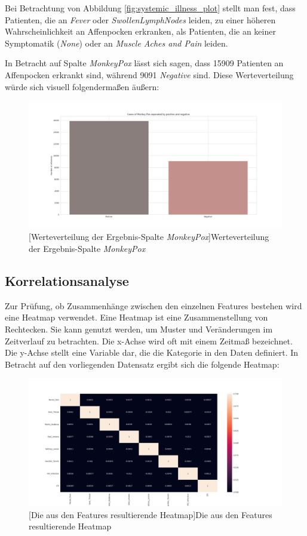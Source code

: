 \documentclass[13pt,a4paper, listof=entryprefix, bibliography=totocnumbered,toc=listofnumbered,lof=listofnumbered]{scrartcl}
\begin{document}
Bei Betrachtung von Abbildung \ref{fig:systemic_illness_plot} stellt man fest, dass Patienten, die an \textit{Fever} oder \textit{Swollen\textunderscore Lymph\textunderscore Nodes} leiden, zu einer
höheren Wahrscheinlichkeit an Affenpocken erkranken, als Patienten, die an keiner Symptomatik (\textit{None}) oder an \textit{Muscle Aches and Pain} leiden.

In Betracht auf Spalte \textit{MonkeyPox} lässt sich sagen, dass 15909 Patienten an Affenpocken erkrankt sind, während 9091 \textit{Negative} sind.
Diese Werteverteilung würde sich visuell folgendermaßen äußern:

	\begin{figure}[H]
		\centering
		\includegraphics[width=0.8\linewidth]{Bilder/monkey_pox_plot.png}
		[Werteverteilung der Ergebnis-Spalte \textit{MonkeyPox}]{Werteverteilung der Ergebnis-Spalte \textit{MonkeyPox}}
		\label{fig:monkey_pox_plot}
	\end{figure}

	\subsection{Korrelationsanalyse}
		\label{ch:korrleations_analyse}

Zur Prüfung, ob Zusammenhänge zwischen den einzelnen Features bestehen wird eine Heatmap verwendet. 
Eine Heatmap ist eine Zusammenstellung von Rechtecken. Sie kann genutzt werden, um Muster und Veränderungen im
Zeitverlauf zu betrachten. Die x-Achse wird oft mit einem Zeitmaß bezeichnet. Die y-Achse stellt eine Variable dar, 
die die Kategorie in den Daten definiert. In Betracht auf den vorliegenden Datensatz ergibt sich die folgende Heatmap:

	\begin{figure}[H]
		\centering
		\includegraphics[width=0.8\linewidth]{Bilder/heat_map.png}
		[Die aus den Features resultierende Heatmap]{Die aus den Features resultierende Heatmap}
		\label{fig:heatmap}
	\end{figure}
	
\end{document}
